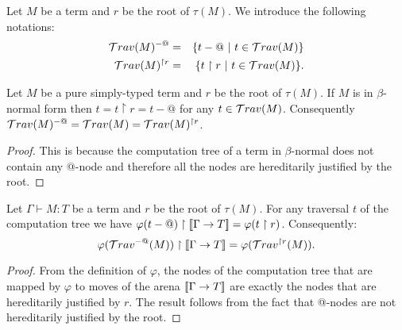 Let $M$ be a term and $r$ be the root of $\tau(M)$. We introduce the following notations:
\begin{eqnarray*}
\mathcal{T}rav(M)^{-@} &=& \{ t - @ \ | \  t \in \mathcal{T}rav(M) \} \\
\mathcal{T}rav(M)^{\upharpoonright r} &=& \{ t  \upharpoonright r \ | \  t  \in \mathcal{T}rav(M) \} .
\end{eqnarray*}

\begin{lem}
Let $M$ be a pure simply-typed term and $r$ be the root of $\tau(M)$.
If $M$ is in $\beta$-normal form then $t = t \upharpoonright r = t - @$ for any $t \in \mathcal{T}rav(M)$.
Consequently $\mathcal{T}rav(M)^{-@} = \mathcal{T}rav(M) =  \mathcal{T}rav(M)^{\upharpoonright r }$.
\end{lem}
\begin{proof}
This is because the computation tree of a term in $\beta$-normal
does not contain any @-node and therefore all the nodes are
hereditarily justified by the root.
\end{proof}



\begin{lem} Let $\Gamma \vdash M :T$ be a term and $r$ be the root of $\tau(M)$.
\label{lem:varphi_filter}
For any traversal $t$ of the computation tree we have
$\varphi(t-@) \upharpoonright {[\![\Gamma \rightarrow T ]\!]} = \varphi(t\upharpoonright r)$.
Consequently:
$$ \varphi(\mathcal{T}rav^{-@}(M)) \upharpoonright {[\![\Gamma \rightarrow T ]\!]} = \varphi(\mathcal{T}rav^{\upharpoonright r}(M)).$$
\end{lem}
\begin{proof}
    From the definition of $\varphi$, the nodes of the computation tree that are mapped by $\varphi$
    to moves of the arena ${[\![ \Gamma \rightarrow T ]\!]}$ are exactly the nodes that are hereditarily justified by $r$.
    The result follows from the fact that @-nodes are not hereditarily justified by the root.
\end{proof}

